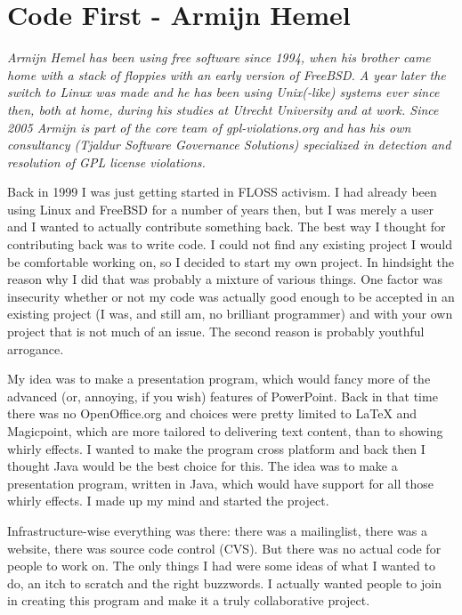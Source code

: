 \chapter{Code First - Armijn Hemel}

\textit{Armijn Hemel has been using free software since 1994, when his brother
came home with a stack of floppies with an early version of FreeBSD. A year
later the switch to Linux was made and he has been using Unix(-like) systems
ever since then, both at home, during his studies at Utrecht University and at
work.
Since 2005 Armijn is part of the core team of gpl-violations.org and has his own
consultancy (Tjaldur Software Governance Solutions) specialized in detection and
resolution of GPL license violations.}

Back in 1999 I was just getting started in FLOSS activism. I had already been
using Linux and FreeBSD for a number of years then, but I was merely a user and
I wanted to actually contribute something back. The best way I thought for
contributing back was to write code. I could not find any existing project I
would be comfortable working on, so I decided to start my own project. In
hindsight the reason why I did that was probably a mixture of various things.
One factor was insecurity whether or not my code was actually good enough to be
accepted in an existing project (I was, and still am, no brilliant programmer)
and with your own project that is not much of an issue. The second reason is
probably youthful arrogance.

My idea was to make a presentation program, which would fancy more of the
advanced (or, annoying, if you wish) features of PowerPoint. Back in that time
there was no OpenOffice.org and choices were pretty limited to LaTeX and
Magicpoint, which are more tailored to delivering text content, than to showing
whirly effects. I wanted to make the program cross platform and back then I
thought Java would be the best choice for this. The idea was to make a
presentation program, written in Java, which would have support for all those
whirly effects. I made up my mind and started the project.

Infrastructure-wise everything was there: there was a mailinglist, there was a
website, there was source code control (CVS). But there was no actual code for
people to work on. The only things I had were some ideas of what I wanted to do,
an itch to scratch and the right buzzwords. I actually wanted people to join in
creating this program and make it a truly collaborative project.

